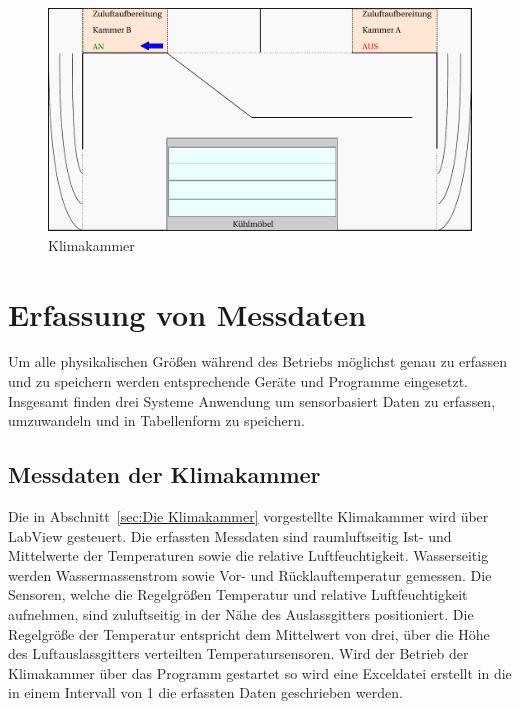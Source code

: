 \begin{figure}[htb]
\centering
\includegraphics[scale=.5]{Pictures/ClimateChamber.pdf}
\caption{Klimakammer}
\label{fig:Klimakammer}
\end{figure}

\section{Erfassung von Messdaten}
\label{sec:Erfassung von Messdaten}

Um alle physikalischen Größen während des Betriebs möglichst genau zu erfassen und zu speichern werden entsprechende Geräte und Programme eingesetzt. Insgesamt finden drei Systeme Anwendung um sensorbasiert Daten zu erfassen, umzuwandeln und in Tabellenform zu speichern.

\subsection{Messdaten der Klimakammer}
\label{subsec:Messdaten der Klimakammer}

Die in Abschnitt~\ref{sec:Die Klimakammer} vorgestellte Klimakammer wird über LabView gesteuert. Die erfassten Messdaten sind raumluftseitig Ist- und Mittelwerte der Temperaturen sowie die relative Luftfeuchtigkeit. Wasserseitig werden Wassermassenstrom sowie Vor- und Rücklauftemperatur gemessen. 
Die Sensoren, welche die Regelgrößen Temperatur und relative Luftfeuchtigkeit aufnehmen, sind zuluftseitig in der Nähe des Auslassgitters positioniert. Die Regelgröße der Temperatur entspricht dem Mittelwert von drei, über die Höhe des Luftauslassgitters verteilten Temperatursensoren. Wird der Betrieb der Klimakammer über das Programm gestartet so wird eine Exceldatei erstellt in die in einem Intervall von \unit{1}{\second} die erfassten Daten geschrieben werden.


